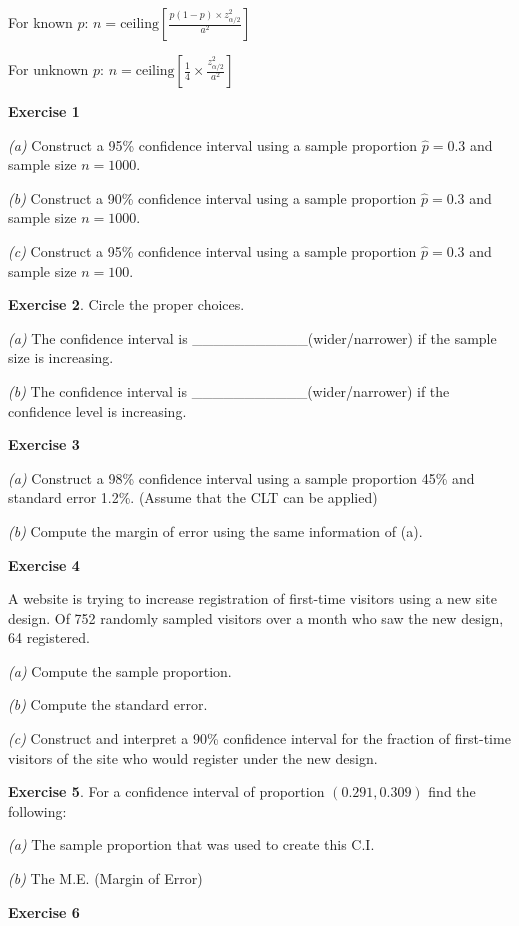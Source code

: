 \documentclass[
]{book}
\begin{document}
For known \(p\): \(n = \text{ceiling} \left[ \frac{p(1-p) \times z_{\alpha/2}^2}{a^2} \right]\)

For unknown \(p\): \(n = \text{ceiling} \left[ \frac{1}{4} \times \frac{z_{\alpha/2}^2}{a^2} \right]\)

\textbf{Exercise 1}

\emph{(a)} Construct a 95\% confidence interval using a sample proportion \(\hat{p} = 0.3\) and sample size \(n=1000\).

\emph{(b)} Construct a 90\% confidence interval using a sample proportion \(\hat{p} = 0.3\) and sample size \(n=1000\).

\emph{(c)} Construct a 95\% confidence interval using a sample proportion \(\hat{p} = 0.3\) and sample size \(n=100\).

\textbf{Exercise 2}. Circle the proper choices.

\emph{(a)} The confidence interval is \_\_\_\_\_\_\_\_\_\_\_(wider/narrower) if the sample size is increasing.

\emph{(b)} The confidence interval is \_\_\_\_\_\_\_\_\_\_\_(wider/narrower) if the confidence level is increasing.

\textbf{Exercise 3}

\emph{(a)} Construct a 98\% confidence interval using a sample proportion 45\% and standard error 1.2\%. (Assume that the CLT can be applied)

\emph{(b)} Compute the margin of error using the same information of (a).

\textbf{Exercise 4}

A website is trying to increase registration of first-time visitors using a new site design. Of 752 randomly sampled visitors over a month who saw the new design, 64 registered.

\emph{(a)} Compute the sample proportion.

\emph{(b)} Compute the standard error.

\emph{(c)} Construct and interpret a 90\% confidence interval for the fraction of first-time visitors of the site who would register under the new design.

\textbf{Exercise 5}. For a confidence interval of proportion \((0.291, 0.309)\) find the following:

\emph{(a)} The sample proportion that was used to create this C.I.

\emph{(b)} The M.E. (Margin of Error)

\textbf{Exercise 6}
\end{document}
